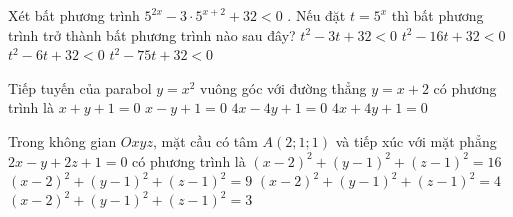 \begin{ex}%
	Xét bất phương trình $5^{2x}-3\cdot 5^{x+2}+32<0$ . Nếu đặt $t=5^x$ thì bất phương trình trở thành bất phương trình nào sau đây?
	\choice
	{$t^2-3t+32<0$}
	{$t^2-16t+32<0$}
	{$t^2-6t+32<0$}
	{\True $t^2-75t+32<0$}
\end{ex}
\begin{ex}%
	Tiếp tuyến của parabol $y=x^2$ vuông góc với đường thẳng $y=x+2$ có phương trình là
	\choice
	{$x+y+1=0$}
	{$x-y+1=0$}
	{$4x-4y+1=0$}
	{\True $4x+4y+1=0$}
\end{ex}
\begin{ex}%
	Trong không gian $Oxyz$, mặt cầu có tâm $A\left(2;1;1\right)$ và tiếp xúc với mặt phẳng $2x-y+2z+1=0$ có phương trình là
	\choice
	{$\left(x-2\right)^2+\left(y-1\right)^2+\left(z-1\right)^2=16$}
	{$\left(x-2\right)^2+\left(y-1\right)^2+\left(z-1\right)^2=9$}
	{\True $\left(x-2\right)^2+\left(y-1\right)^2+\left(z-1\right)^2=4$}
	{$\left(x-2\right)^2+\left(y-1\right)^2+\left(z-1\right)^2=3$}
\end{ex}
